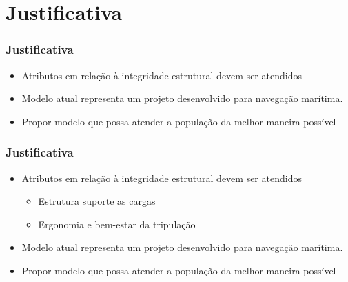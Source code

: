 \documentclass{beamer}
\begin{document}
\section{Justificativa}
\begin{frame}
\tableofcontents[ 
    currentsubsection, 
    hideothersubsections, 
    sectionstyle=show/shaded
    ] 
\end{frame}
\begin{frame}
\frametitle{Justificativa}
\begin{itemize}
\item Atributos em relação à integridade estrutural devem ser atendidos
\item Modelo atual representa um projeto desenvolvido para navegação marítima.
\item Propor modelo que possa atender a população da melhor maneira possível  
\end{itemize}
\end{frame}

\begin{frame}
\frametitle{Justificativa}
\begin{itemize}
	\item \alert{Atributos em relação à integridade estrutural devem ser atendidos}
	\begin{itemize}
		\item Estrutura suporte as cargas
		\item Ergonomia e bem-estar da tripulação
	\end{itemize}
	\item Modelo atual representa um projeto desenvolvido para navegação marítima.
	\item Propor modelo que possa atender a população da melhor maneira possível  
\end{itemize}
\end{frame}
\end{document}
